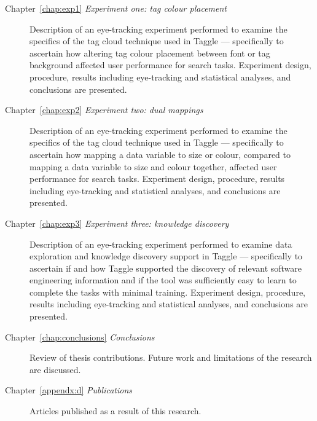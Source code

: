 \begin{description}
	\item[Chapter~\ref{chap:exp1} \emph{Experiment one: tag colour placement}] Description of an eye-tracking experiment performed to examine the specifics of the tag cloud technique used in Taggle --- specifically to ascertain how altering tag colour placement between font or tag background affected user performance for search tasks. Experiment design, procedure, results including eye-tracking and statistical analyses, and conclusions are presented.
	\item[Chapter~\ref{chap:exp2} \emph{Experiment two: dual mappings}] Description of an eye-tracking experiment performed to examine the specifics of the tag cloud technique used in Taggle --- specifically to ascertain how mapping a data variable to size or colour, compared to mapping a data variable to size and colour together, affected user performance for search tasks. Experiment design, procedure, results including eye-tracking and statistical analyses, and conclusions are presented.
	\item[Chapter~\ref{chap:exp3} \emph{Experiment three: knowledge discovery}] Description of an eye-tracking experiment performed to examine data exploration and knowledge discovery support in Taggle --- specifically to ascertain if and how Taggle supported the discovery of relevant software engineering information and if the tool was sufficiently easy to learn to complete the tasks with minimal training. Experiment design, procedure, results including eye-tracking and statistical analyses, and conclusions are presented.
	\item[Chapter~\ref{chap:conclusions} \emph{Conclusions}] Review of thesis contributions. Future work and limitations of the research are discussed.
	\item[Chapter~\ref{appendx:d} \emph{Publications}] Articles published as a result of this research.
\end{description}



